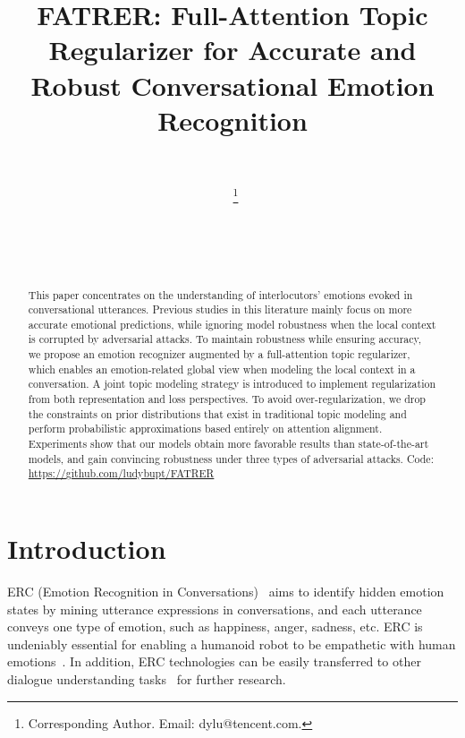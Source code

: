 \documentclass{ecai}
\begin{document}
\begin{frontmatter}
\title{FATRER: Full-Attention Topic Regularizer for Accurate and Robust Conversational Emotion Recognition}

\author[A]{~}
\author[B]{~\thanks{Corresponding Author. Email: dylu@tencent.com.}}
\author[C]{~}
\author[A]{~} 


\address[A]{Artificial Intelligence Center, Dasouche Inc, China}
\address[B]{Pattern Recognition Center, Wechat AI, Tencent Inc, China}
\address[C]{Beijing University of Posts and Telecommunications, China}

\begin{abstract}
This paper concentrates on the understanding of interlocutors' emotions evoked in conversational utterances. Previous studies in this literature mainly focus on more accurate emotional predictions, while ignoring model robustness when the local context is corrupted by adversarial attacks. To maintain robustness while ensuring accuracy, we propose an emotion recognizer augmented by a full-attention topic regularizer, which enables an emotion-related global view when modeling the local context in a conversation. A joint topic modeling strategy is introduced to implement regularization from both representation and loss perspectives. To avoid over-regularization, we drop the constraints on prior distributions that exist in traditional topic modeling and perform probabilistic approximations based entirely on attention alignment. Experiments show that our models obtain more favorable results than state-of-the-art models, and gain convincing robustness under three types of adversarial attacks. Code: \url{https://github.com/ludybupt/FATRER}
\end{abstract}

\end{frontmatter}

\section{Introduction}
ERC (Emotion Recognition in Conversations)~\cite{majumder2019dialoguernn,poria2019emotion} aims to identify hidden emotion states by mining utterance expressions in conversations, and each utterance conveys one type of emotion, such as happiness, anger, sadness, etc. ERC is undeniably essential for enabling a humanoid robot to be empathetic with human emotions~\cite{lin2020caire,ma2020survey}. In addition, ERC technologies can be easily transferred to other dialogue understanding tasks~\cite{ghosal2020utterance,wu2021topicka} for further research. 
\end{document}

